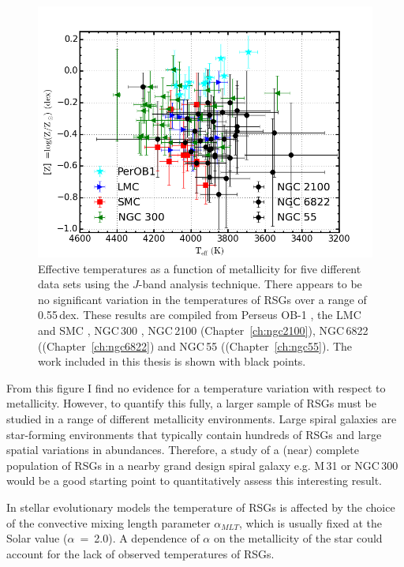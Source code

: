 \begin{figure}
 \centering
\includegraphics[width=\textwidth]{conclusions/RSGTeffvsZ-all}
\caption[Effective temperature as a function of metallicity in different environments]{
Effective temperatures as a function of metallicity for five different data sets using the $J$-band analysis technique.
There appears to be no significant variation in the temperatures of RSGs over a range of 0.55\,dex.
These results are compiled from
Perseus OB-1
\protect\citep[a Galactic RSG cluster; cyan;][]{2014ApJ...788...58G},
the LMC and SMC
\protect\citep[blue and red points respectively;][]{2015ApJ...806...21D},
NGC\,300
\protect\citep[green points;][]{2015ApJ...805..182G},
NGC\,2100 (Chapter~\ref{ch:ngc2100}),
NGC\,6822 ((Chapter~\ref{ch:ngc6822})
and NGC\,55 ((Chapter~\ref{ch:ngc55}).
The work included in this thesis is shown with black points.
\label{fig:TeffvsZ}
         }
\end{figure}

From this figure I find no evidence for a temperature variation with respect to metallicity.
However, to quantify this fully, a larger sample of RSGs must be studied in a range of different metallicity environments.
Large spiral galaxies are star-forming environments that typically contain hundreds of RSGs and large spatial variations in abundances.
Therefore, a study of a (near) complete population of RSGs in a nearby grand design spiral galaxy e.g. M\,31 or NGC\,300 would be a good starting point to quantitatively assess this interesting result.

In stellar evolutionary models the temperature of RSGs is affected by the choice of the convective mixing length parameter $\alpha_{MLT}$, which is usually fixed at the Solar value ($\alpha$~=~2.0).
A dependence of $\alpha$ on the metallicity of the star could account for the lack of observed temperatures of RSGs.

